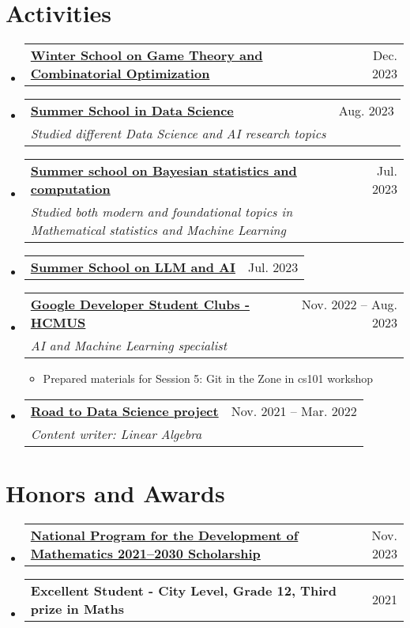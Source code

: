 \documentclass[letterpaper,11pt]{article}
\makeatletter
\newcommand{\heading}[4]{
    \normalsize
    \begin{tabular*}{0.97\textwidth}[t]{l@{\extracolsep{\fill}}r}
      \textbf{#1} & #2 \\[-2pt]
      \textit{\small#3} & \textit{\small #4}
    \end{tabular*}
    \vspace{-2pt}
}
\newcommand{\subheading}[2]{
    \normalsize
    \begin{tabular*}{0.97\textwidth}[t]{l@{\extracolsep{\fill}}r}
      \textbf{#1} & #2 \\
    \end{tabular*}
    \vspace{-2pt}
}
\makeatother
\begin{document}
\section{Activities}
    \begin{itemize}
        
        \item \subheading{\href{https://viasm.edu.vn/hdkh/VORN-03}{Winter School on Game Theory and Combinatorial Optimization}}{Dec. 2023}
        
        \item \heading{\href{https://viasm.edu.vn/hdkh/ssds2023}{Summer School in Data Science}}{Aug. 2023}{Studied different Data Science and AI research topics}{}
        
        \item \heading{\href{https://viasm.edu.vn/hdkh/somsaml}{Summer school on Bayesian statistics and computation}}{Jul. 2023}{Studied both modern and foundational topics in Mathematical statistics and Machine Learning}{}

        \item \subheading{\href{https://www.fit.hcmus.edu.vn/vn/Default.aspx?tabid=292\&id=15455}{Summer School on LLM and AI}}{Jul. 2023}
        
        \item \heading{\href{https://www.facebook.com/gdsc.hcmus}{Google Developer Student Clubs - HCMUS}}{Nov. 2022 -- Aug. 2023}{AI and Machine Learning specialist}{}
            \begin{itemize}
                \item Prepared materials for Session 5: Git in the Zone in cs101 workshop 
            \end{itemize}
        
        \item \heading{\href{https://www.facebook.com/RDSproject/}{Road to Data Science project}}{Nov. 2021 -- Mar. 2022}{Content writer: Linear Algebra}{}
    \end{itemize}


\section{Honors and Awards}
    \begin{itemize}
        \item \subheading{\href{https://viasm.edu.vn/hoat-dong-khoa-hoc/tin-tuc/chi-tiet/hoc-bong-chuong-trinh-toan-nam-hoc-2023-2024}{\small National Program for the Development of Mathematics  2021--2030 Scholarship}}{Nov. 2023}
        
        \item \subheading{\small Excellent Student - City Level, Grade 12, Third prize in Maths}{2021}
    \end{itemize}
\end{document}
